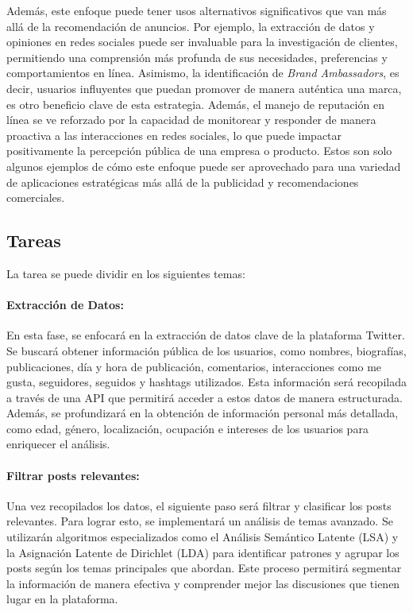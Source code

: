 \documentclass[
  letterpaper,
  DIV=11,
  numbers=noendperiod]{scrartcl}
\let\oldparagraph\paragraph
\renewcommand{\paragraph}[1]{\oldparagraph{#1}\mbox{}}
\begin{document}
Además, este enfoque puede tener usos alternativos significativos que
van más allá de la recomendación de anuncios. Por ejemplo, la extracción
de datos y opiniones en redes sociales puede ser invaluable para la
investigación de clientes, permitiendo una comprensión más profunda de
sus necesidades, preferencias y comportamientos en línea. Asimismo, la
identificación de \emph{Brand Ambassadors}, es decir, usuarios
influyentes que puedan promover de manera auténtica una marca, es otro
beneficio clave de esta estrategia. Además, el manejo de reputación en
línea se ve reforzado por la capacidad de monitorear y responder de
manera proactiva a las interacciones en redes sociales, lo que puede
impactar positivamente la percepción pública de una empresa o producto.
Estos son solo algunos ejemplos de cómo este enfoque puede ser
aprovechado para una variedad de aplicaciones estratégicas más allá de
la publicidad y recomendaciones comerciales.

\subsection{Tareas}\label{tareas}

La tarea se puede dividir en los siguientes temas:

\paragraph{Extracción de Datos:}\label{extracciuxf3n-de-datos}

En esta fase, se enfocará en la extracción de datos clave de la
plataforma Twitter. Se buscará obtener información pública de los
usuarios, como nombres, biografías, publicaciones, día y hora de
publicación, comentarios, interacciones como me gusta, seguidores,
seguidos y hashtags utilizados. Esta información será recopilada a
través de una API que permitirá acceder a estos datos de manera
estructurada. Además, se profundizará en la obtención de información
personal más detallada, como edad, género, localización, ocupación e
intereses de los usuarios para enriquecer el análisis.

\paragraph{Filtrar posts relevantes:}\label{filtrar-posts-relevantes}

Una vez recopilados los datos, el siguiente paso será filtrar y
clasificar los posts relevantes. Para lograr esto, se implementará un
análisis de temas avanzado. Se utilizarán algoritmos especializados como
el Análisis Semántico Latente (LSA) y la Asignación Latente de Dirichlet
(LDA) para identificar patrones y agrupar los posts según los temas
principales que abordan. Este proceso permitirá segmentar la información
de manera efectiva y comprender mejor las discusiones que tienen lugar
en la plataforma.
\end{document}
